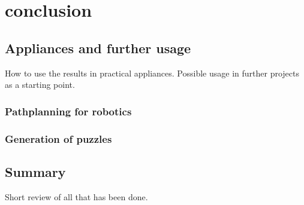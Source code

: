 \chapter{conclusion}
\section{Appliances and further usage}
How to use the results in practical appliances.
Possible usage in further projects as a starting point.
\subsection{Pathplanning for robotics}
\subsection{Generation of puzzles}

\section{Summary}
Short review of all that has been done.